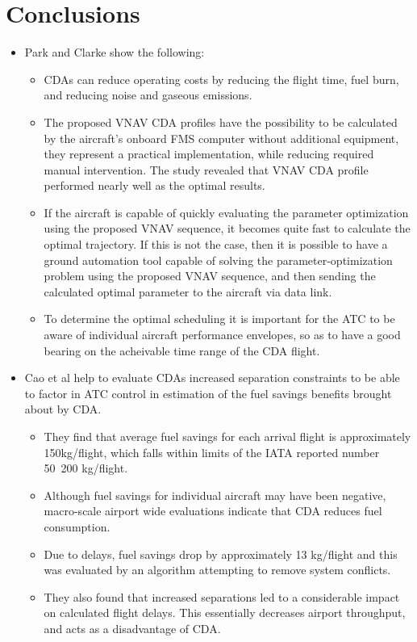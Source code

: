 \documentclass{aer1315-pretty}
\begin{document}

\section{Conclusions}  \label{sec:conclusion}

\begin{itemize}

\item Park and Clarke \cite{Park:2015}  show the following:
\begin{itemize}
\item CDAs can reduce operating costs by reducing the flight time, fuel burn, and reducing noise and gaseous emissions. 
\item The proposed VNAV CDA profiles have the possibility to be calculated by the aircraft's onboard FMS computer without additional equipment, they represent a practical implementation, while reducing required manual intervention. The study revealed that VNAV CDA profile performed nearly well as the optimal results. 
\item If the aircraft is capable of  quickly evaluating the parameter optimization using the proposed VNAV sequence, it becomes quite fast to calculate the optimal trajectory. If this is not the case, then it is possible to have a ground automation tool capable of solving the parameter-optimization problem using the proposed VNAV sequence, and then sending the calculated optimal parameter to the aircraft via data link. 
\item  To determine the optimal scheduling it is important for the ATC to be aware of individual aircraft performance envelopes, so as to have a good bearing on the acheivable time range of the CDA flight. 
\end{itemize}

\item Cao et al \cite{Cao:2013} help to evaluate  CDAs increased separation constraints to be able to factor in ATC control in estimation of the fuel savings benefits brought about by CDA. 
\begin{itemize}
\item They find that average fuel savings for each arrival flight is approximately 150kg/flight, which falls within limits of the IATA reported number 50~200 kg/flight. 
\item Although fuel savings for individual aircraft  may have been negative, macro-scale  airport wide evaluations indicate that CDA reduces fuel consumption. 
\item Due to delays, fuel savings drop by approximately 13 kg/flight and this was evaluated by an algorithm attempting to remove system conflicts.
\item They also found that increased separations led to a considerable impact on calculated flight delays. This essentially decreases airport throughput, and acts as a disadvantage of CDA.
\end{itemize}



\end{itemize}
\end{document}
